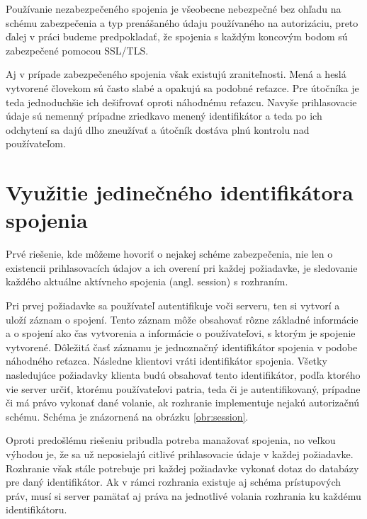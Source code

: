 Používanie nezabezpečeného spojenia je všeobecne nebezpečné bez ohľadu na schému zabezpečenia a typ prenášaného údaju používaného na autorizáciu, preto ďalej v práci budeme predpokladať, že spojenia s každým koncovým bodom sú zabezpečené pomocou SSL/TLS.

Aj v prípade zabezpečeného spojenia však existujú zraniteľnosti. Mená a heslá vytvorené človekom sú často slabé a opakujú sa podobné reťazce. Pre útočníka je teda jednoduchšie ich dešifrovať oproti náhodnému reťazcu. Navyše prihlasovacie údaje sú nemenný prípadne zriedkavo menený identifikátor a teda po ich odchytení sa dajú dlho zneužívať a útočník dostáva plnú kontrolu nad používateľom.


\section{Využitie jedinečného identifikátora spojenia}
\label{sec:session}

Prvé riešenie, kde môžeme hovoriť o nejakej schéme zabezpečenia, nie len o existencii prihlasovacích údajov a ich overení pri každej požiadavke, je sledovanie každého aktuálne aktívneho spojenia (angl. session) s rozhraním.

Pri prvej požiadavke sa používateľ autentifikuje voči serveru, ten si vytvorí a uloží záznam o spojení. Tento záznam môže obsahovať rôzne základné informácie a o spojení ako čas vytvorenia a informácie o používateľovi, s ktorým je spojenie vytvorené. Dôležitá časť záznamu je jednoznačný identifikátor spojenia v podobe náhodného reťazca. Následne klientovi vráti identifikátor spojenia. Všetky nasledujúce požiadavky klienta budú obsahovať tento identifikátor, podľa ktorého vie server určiť, ktorému používateľovi patria, teda či je autentifikovaný, prípadne či má právo vykonať dané volanie, ak rozhranie implementuje nejakú autorizačnú schému. Schéma je znázornená na obrázku \ref{obr:session}.

Oproti predošlému riešeniu pribudla potreba manažovať spojenia, no veľkou výhodou je, že sa už neposielajú citlivé prihlasovacie údaje v každej požiadavke. Rozhranie však stále potrebuje pri každej požiadavke vykonať dotaz do databázy pre daný identifikátor. Ak v rámci rozhrania existuje aj schéma prístupových práv, musí si server pamätať aj práva na jednotlivé volania rozhrania ku každému identifikátoru.


